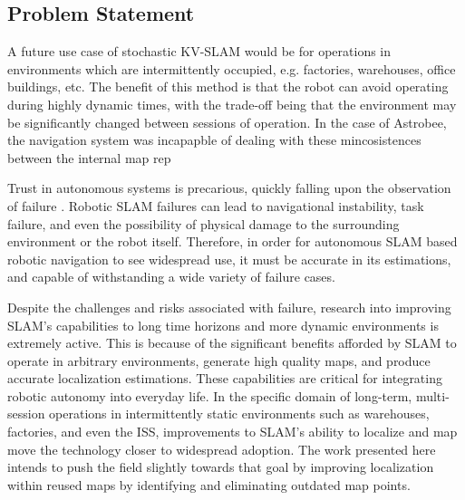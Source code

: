 \subsection{Problem Statement}

A future use case of stochastic KV-SLAM would be for operations in environments which are intermittently occupied, e.g. factories, warehouses, office buildings, etc. The benefit of this method is that the robot can avoid operating during highly dynamic times, with the trade-off being that the environment may be significantly changed between sessions of operation. In the case of Astrobee, the navigation system was incapapble of dealing with these mincosistences between the internal map rep


Trust in autonomous systems is precarious, quickly falling upon the observation of failure \cite{robinetteEffectRobotPerformance2017}. Robotic SLAM failures can lead to navigational instability, task failure, and even the possibility of physical damage to the surrounding environment or the robot itself\cite{nahavandiComprehensiveReviewAutonomous2025a}. Therefore, in order for autonomous SLAM based robotic navigation to see widespread use, it must be accurate in its estimations, and capable of withstanding a wide variety of failure cases.


Despite the challenges and risks associated with failure, research into improving SLAM's capabilities to long time horizons and more dynamic environments is extremely active. This is because of the significant benefits afforded by SLAM to operate in arbitrary environments, generate high quality maps, and produce accurate localization estimations. These capabilities are critical for integrating robotic autonomy into everyday life. In the specific domain of long-term, multi-session operations in intermittently static environments such as warehouses, factories, and even the ISS, improvements to SLAM's ability to localize and map move the technology closer to widespread adoption.  The work presented here intends to push the field slightly towards that goal by improving localization within reused maps by identifying and eliminating outdated map points.

